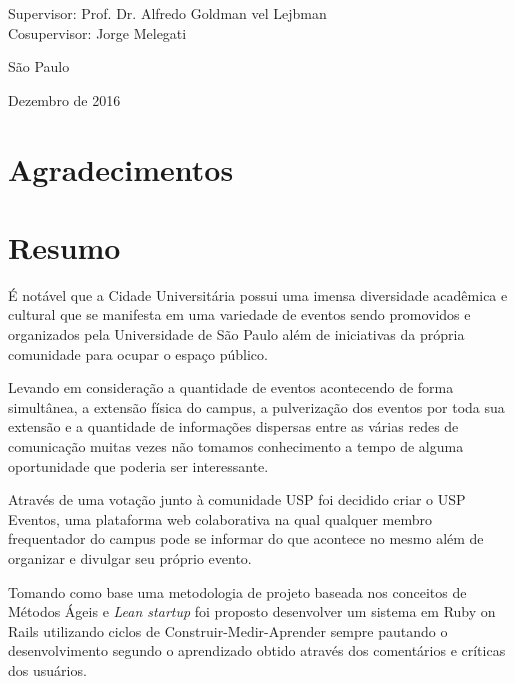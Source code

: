 \documentclass[12pt,twoside,a4paper]{book}
\begin{document}
    \vskip 5cm

    \begin{center}
    Supervisor: Prof. Dr. Alfredo Goldman vel Lejbman\\
    Cosupervisor: Jorge Melegati

    \vskip 5cm
    \normalsize{São Paulo}

    \normalsize{Dezembro de 2016}
    \end{center}
\pagebreak




\chapter*{Agradecimentos}



\chapter*{Resumo}
    \par É notável que a Cidade Universitária possui uma imensa diversidade acadêmica e cultural que se manifesta em  uma variedade de eventos sendo promovidos e organizados pela Universidade de São Paulo além de iniciativas da própria comunidade para ocupar o espaço público.
    \par Levando em consideração a quantidade de eventos acontecendo de forma simultânea, a extensão física do campus, a pulverização dos eventos por toda sua extensão  e a quantidade de informações dispersas entre as várias redes de comunicação muitas vezes não tomamos conhecimento a tempo de alguma oportunidade que poderia ser interessante.
    \par Através de uma votação junto à comunidade USP foi decidido criar o USP Eventos, uma plataforma web colaborativa na qual qualquer membro frequentador do campus pode se informar do que acontece no mesmo além de organizar e divulgar seu próprio evento.
    \par Tomando como base uma metodologia de projeto baseada nos conceitos de Métodos Ágeis e \emph{Lean startup} foi proposto desenvolver um sistema em Ruby on Rails utilizando ciclos de Construir-Medir-Aprender sempre pautando o desenvolvimento segundo o aprendizado obtido através dos  comentários e críticas dos usuários.
\\
\end{document}
